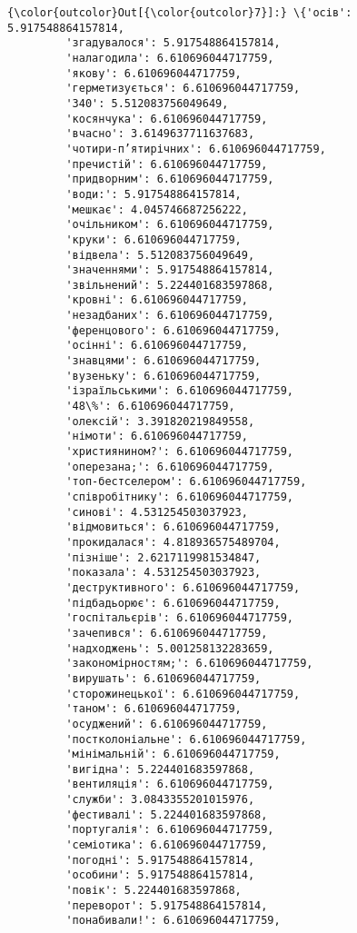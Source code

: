 \documentclass[11pt]{article}
\begin{document}
\begin{Verbatim}[commandchars=\\\{\}]
{\color{outcolor}Out[{\color{outcolor}7}]:} \{'осів': 5.917548864157814,
         'згадувалося': 5.917548864157814,
         'налагодила': 6.610696044717759,
         'якову': 6.610696044717759,
         'герметизується': 6.610696044717759,
         '340': 5.512083756049649,
         'косянчука': 6.610696044717759,
         'вчасно': 3.6149637711637683,
         'чотири-п’ятирічних': 6.610696044717759,
         'пречистій': 6.610696044717759,
         'придворним': 6.610696044717759,
         'води:': 5.917548864157814,
         'мешкає': 4.045746687256222,
         'очільником': 6.610696044717759,
         'круки': 6.610696044717759,
         'відвела': 5.512083756049649,
         'значеннями': 5.917548864157814,
         'звільнений': 5.224401683597868,
         'кровні': 6.610696044717759,
         'незадбаних': 6.610696044717759,
         'ференцового': 6.610696044717759,
         'осінні': 6.610696044717759,
         'знавцями': 6.610696044717759,
         'вузеньку': 6.610696044717759,
         'ізраїльськими': 6.610696044717759,
         '48\%': 6.610696044717759,
         'олексій': 3.391820219849558,
         'німоти': 6.610696044717759,
         'християнином?': 6.610696044717759,
         'оперезана;': 6.610696044717759,
         'топ-бестселером': 6.610696044717759,
         'співробітнику': 6.610696044717759,
         'синові': 4.531254503037923,
         'відмовиться': 6.610696044717759,
         'прокидалася': 4.818936575489704,
         'пізніше': 2.6217119981534847,
         'показала': 4.531254503037923,
         'деструктивного': 6.610696044717759,
         'підбадьорює': 6.610696044717759,
         'госпітальєрів': 6.610696044717759,
         'зачепився': 6.610696044717759,
         'надходжень': 5.001258132283659,
         'закономірностям;': 6.610696044717759,
         'вирушать': 6.610696044717759,
         'сторожинецької': 6.610696044717759,
         'таном': 6.610696044717759,
         'осуджений': 6.610696044717759,
         'постколоніальне': 6.610696044717759,
         'мінімальній': 6.610696044717759,
         'вигідна': 5.224401683597868,
         'вентиляція': 6.610696044717759,
         'служби': 3.0843355201015976,
         'фестивалі': 5.224401683597868,
         'португалія': 6.610696044717759,
         'семіотика': 6.610696044717759,
         'погодні': 5.917548864157814,
         'особини': 5.917548864157814,
         'повік': 5.224401683597868,
         'переворот': 5.917548864157814,
         'понабивали!': 6.610696044717759,

\end{Verbatim}
\end{document}
